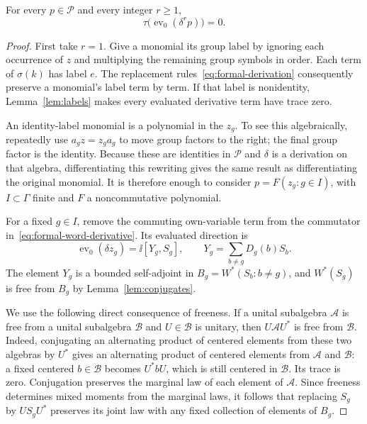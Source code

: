 \begin{lemma}
\label{lem:flow-trace-identity}
For every $p\in\mathcal P$ and every integer $r\geq1$,
\begin{equation}
 \tau\bigl(\operatorname{ev}_0(\delta^r p)\bigr)=0.
 \label{eq:universal-trace-identity}
\end{equation}
\end{lemma}

\begin{proof}
First take $r=1$. Give a monomial its group label by ignoring each
occurrence of $z$ and multiplying the remaining group symbols in
order. Each term of $\sigma(k)$ has label $e$. The replacement
rules~\eqref{eq:formal-derivation} consequently preserve a monomial's
label term by term. If that label is nonidentity,
Lemma~\ref{lem:labels} makes every evaluated derivative term have
trace zero.

An identity-label monomial is a polynomial in the $z_g$. To see
this algebraically, repeatedly use $a_gz=z_ga_g$ to move group
factors to the right; the final group factor is the identity.
Because these are identities in $\mathcal P$ and $\delta$ is a
derivation on that algebra, differentiating this rewriting gives
the same result as differentiating the original monomial.
It is therefore enough to consider
$p=F(z_g:g\in I)$, with $I\subset\Gamma$ finite and $F$ a
noncommutative polynomial.

For a fixed $g\in I$, remove the commuting own-variable term from
the commutator in~\eqref{eq:formal-word-derivative}. Its evaluated
direction is
\[
 \operatorname{ev}_0(\delta z_g)=\ii[Y_g,S_g],\qquad
 Y_g=\sum_{b\ne g}D_g(b)S_b.
\]
The element $Y_g$ is a bounded self-adjoint in
$B_g=W^*(S_b:b\ne g)$, and $W^*(S_g)$ is free from $B_g$ by
Lemma~\ref{lem:conjugates}.

We use the following direct consequence of freeness. If a unital
subalgebra $\mathcal A$ is free from a unital subalgebra
$\mathcal B$ and $U\in\mathcal B$ is unitary, then
$U\mathcal A U^*$ is free from $\mathcal B$. Indeed, conjugating
an alternating product of centered elements from these two
algebras by $U^*$ gives an alternating product of centered
elements from $\mathcal A$ and $\mathcal B$: a fixed centered
$b\in\mathcal B$ becomes $U^*bU$, which is still centered in
$\mathcal B$. Its trace is zero. Conjugation preserves the
marginal law of each element of $\mathcal A$. Since freeness
determines mixed moments from the marginal laws, it follows that
replacing $S_g$ by $US_gU^*$ preserves its joint law with any
fixed collection of elements of $B_g$.


\end{proof}
